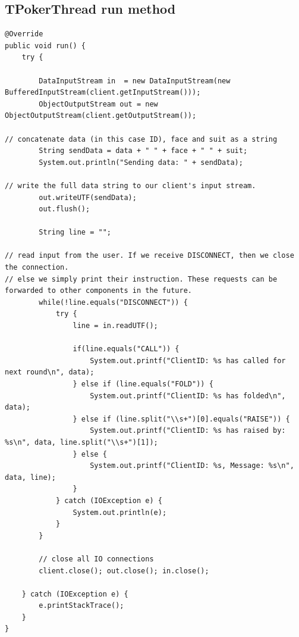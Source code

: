 \documentclass[11pt]{article}
\begin{document}
\subsection{TPokerThread run method}
\begin{lstlisting}[breaklines=true]
@Override
public void run() {
	try {

		DataInputStream in  = new DataInputStream(new BufferedInputStream(client.getInputStream()));
		ObjectOutputStream out = new ObjectOutputStream(client.getOutputStream());

// concatenate data (in this case ID), face and suit as a string
		String sendData = data + " " + face + " " + suit;
		System.out.println("Sending data: " + sendData);

// write the full data string to our client's input stream.
		out.writeUTF(sendData);
		out.flush();
		
		String line = "";

// read input from the user. If we receive DISCONNECT, then we close the connection.
// else we simply print their instruction. These requests can be forwarded to other components in the future.
		while(!line.equals("DISCONNECT")) {
			try {
				line = in.readUTF();

				if(line.equals("CALL")) {
					System.out.printf("ClientID: %s has called for next round\n", data);
				} else if (line.equals("FOLD")) {
					System.out.printf("ClientID: %s has folded\n", data);
				} else if (line.split("\\s+")[0].equals("RAISE")) {
					System.out.printf("ClientID: %s has raised by: %s\n", data, line.split("\\s+")[1]);
				} else {
					System.out.printf("ClientID: %s, Message: %s\n", data, line);
				}
			} catch (IOException e) {
				System.out.println(e);
			}
		}

		// close all IO connections
		client.close(); out.close(); in.close();

	} catch (IOException e) {
		e.printStackTrace();
	}
}
\end{lstlisting}
\newpage
\end{document}
